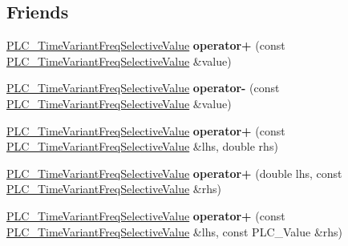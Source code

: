 \subsection*{\-Friends}
\begin{DoxyCompactItemize}
\item 
\hypertarget{classns3_1_1PLC__TimeVariantFreqSelectiveValue_a163db76e8766938655ce12edcd7fe649}{\hyperlink{classns3_1_1PLC__TimeVariantFreqSelectiveValue}{\-P\-L\-C\-\_\-\-Time\-Variant\-Freq\-Selective\-Value} {\bfseries operator+} (const \hyperlink{classns3_1_1PLC__TimeVariantFreqSelectiveValue}{\-P\-L\-C\-\_\-\-Time\-Variant\-Freq\-Selective\-Value} \&value)}\label{classns3_1_1PLC__TimeVariantFreqSelectiveValue_a163db76e8766938655ce12edcd7fe649}

\item 
\hypertarget{classns3_1_1PLC__TimeVariantFreqSelectiveValue_a46b20c4b049a4437a532bcabac715692}{\hyperlink{classns3_1_1PLC__TimeVariantFreqSelectiveValue}{\-P\-L\-C\-\_\-\-Time\-Variant\-Freq\-Selective\-Value} {\bfseries operator-\/} (const \hyperlink{classns3_1_1PLC__TimeVariantFreqSelectiveValue}{\-P\-L\-C\-\_\-\-Time\-Variant\-Freq\-Selective\-Value} \&value)}\label{classns3_1_1PLC__TimeVariantFreqSelectiveValue_a46b20c4b049a4437a532bcabac715692}

\item 
\hypertarget{classns3_1_1PLC__TimeVariantFreqSelectiveValue_a9a4998c19f1dc0b02fe12170322451e5}{\hyperlink{classns3_1_1PLC__TimeVariantFreqSelectiveValue}{\-P\-L\-C\-\_\-\-Time\-Variant\-Freq\-Selective\-Value} {\bfseries operator+} (const \hyperlink{classns3_1_1PLC__TimeVariantFreqSelectiveValue}{\-P\-L\-C\-\_\-\-Time\-Variant\-Freq\-Selective\-Value} \&lhs, double rhs)}\label{classns3_1_1PLC__TimeVariantFreqSelectiveValue_a9a4998c19f1dc0b02fe12170322451e5}

\item 
\hypertarget{classns3_1_1PLC__TimeVariantFreqSelectiveValue_a060ff14f21d4ada7a1a5623ebefd32ae}{\hyperlink{classns3_1_1PLC__TimeVariantFreqSelectiveValue}{\-P\-L\-C\-\_\-\-Time\-Variant\-Freq\-Selective\-Value} {\bfseries operator+} (double lhs, const \hyperlink{classns3_1_1PLC__TimeVariantFreqSelectiveValue}{\-P\-L\-C\-\_\-\-Time\-Variant\-Freq\-Selective\-Value} \&rhs)}\label{classns3_1_1PLC__TimeVariantFreqSelectiveValue_a060ff14f21d4ada7a1a5623ebefd32ae}

\item 
\hypertarget{classns3_1_1PLC__TimeVariantFreqSelectiveValue_a473f93beeaeaff1ee325e4448c9c6a04}{\hyperlink{classns3_1_1PLC__TimeVariantFreqSelectiveValue}{\-P\-L\-C\-\_\-\-Time\-Variant\-Freq\-Selective\-Value} {\bfseries operator+} (const \hyperlink{classns3_1_1PLC__TimeVariantFreqSelectiveValue}{\-P\-L\-C\-\_\-\-Time\-Variant\-Freq\-Selective\-Value} \&lhs, const \-P\-L\-C\-\_\-\-Value \&rhs)}\label{classns3_1_1PLC__TimeVariantFreqSelectiveValue_a473f93beeaeaff1ee325e4448c9c6a04}


\end{DoxyCompactItemize}
